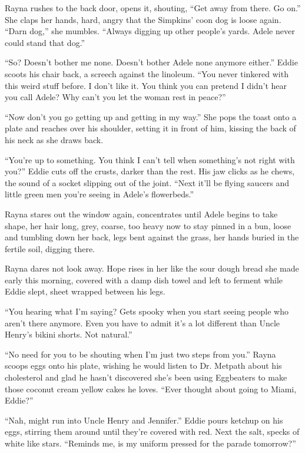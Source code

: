 \documentclass[twoside,10pt]{book}
\begin{document}
Rayna rushes to the back door, opens it, shouting, ``Get away from
there. Go on.'' She claps her hands, hard, angry that the Simpkins' coon
dog is loose again. ``Darn dog,'' she mumbles. ``Always digging up other
people's yards. Adele never could stand that dog.''

``So? Doesn't bother me none. Doesn't bother Adele none anymore
either.'' Eddie scoots his chair back, a screech against the linoleum.
``You never tinkered with this weird stuff before. I don't like it. You
think you can pretend I didn't hear you call Adele? Why can't you let
the woman rest in peace?''

``Now don't you go getting up and getting in my way.'' She pops the
toast onto a plate and reaches over his shoulder, setting it in front of
him, kissing the back of his neck as she draws back.

``You're up to something. You think I can't tell when something's not
right with you?'' Eddie cuts off the crusts, darker than the rest. His
jaw clicks as he chews, the sound of a socket slipping out of the joint.
``Next it'll be flying saucers and little green men you're seeing in
Adele's flowerbeds.''

Rayna stares out the window again, concentrates until Adele begins to
take shape, her hair long, grey, coarse, too heavy now to stay pinned in
a bun, loose and tumbling down her back, legs bent against the grass,
her hands buried in the fertile soil, digging there.

Rayna dares not look away. Hope rises in her like the sour dough bread
she made early this morning, covered with a damp dish towel and left to
ferment while Eddie slept, sheet wrapped between his legs.

``You hearing what I'm saying? Gets spooky when you start seeing people
who aren't there any­more. Even you have to admit it's a lot different
than Uncle Henry's bikini shorts. Not natural.''

``No need for you to be shouting when I'm just two steps from you.''
Rayna scoops eggs onto his plate, wishing he would listen to Dr. Metpath
about his cholesterol and glad he hasn't discovered she's been using
Eggbeaters to make those coconut cream yellow cakes he loves. ``Ever
thought about going to Miami, Eddie?''

``Nah, might run into Uncle Henry and Jennifer.'' Eddie pours ketchup on
his eggs, stirring them around until they're covered with red. Next the
salt, specks of white like stars. ``Reminds me, is my uniform pressed
for the parade tomorrow?''
\end{document}
